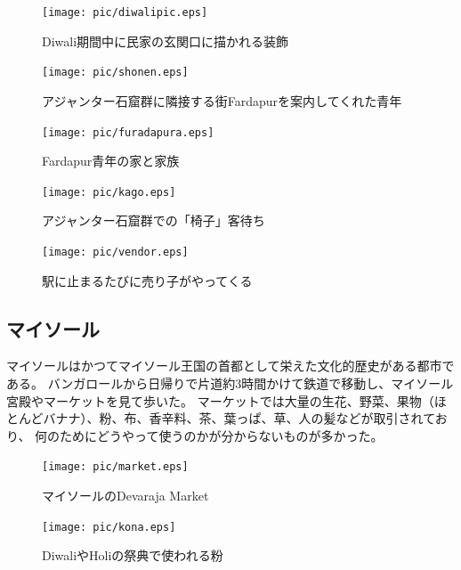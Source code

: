 \begin{figure}[H]
  \begin{minipage}{0.39\hsize}
  \begin{center}
    \texttt{[image: pic/diwalipic.eps]}
  \end{center}
  \caption{Diwali期間中に民家の玄関口に描かれる装飾}
  \end{minipage}
  \begin{minipage}{0.39\hsize}
  \begin{center}
    \texttt{[image: pic/shonen.eps]}
  \end{center}
  \caption{アジャンター石窟群に隣接する街Fardapurを案内してくれた青年}
  \end{minipage}
  \begin{minipage}{0.19\hsize}
  \begin{center}
    \texttt{[image: pic/furadapura.eps]}
  \end{center}
  \caption{Fardapur青年の家と家族}
  \end{minipage}
\end{figure}
\begin{figure}[H]
  \begin{minipage}{0.5\hsize}
  \begin{center}
    \texttt{[image: pic/kago.eps]}
  \end{center}
  \caption{アジャンター石窟群での「椅子」客待ち}
  \end{minipage}
  \begin{minipage}{0.5\hsize}
  \begin{center}
    \texttt{[image: pic/vendor.eps]}
  \end{center}
  \caption{駅に止まるたびに売り子がやってくる}
  \end{minipage}
\end{figure}
\subsection{マイソール}
マイソールはかつてマイソール王国の首都として栄えた文化的歴史がある都市である。
バンガロールから日帰りで片道約3時間かけて鉄道で移動し、マイソール宮殿やマーケットを見て歩いた。
マーケットでは大量の生花、野菜、果物（ほとんどバナナ）、粉、布、香辛料、茶、葉っぱ、草、人の髪などが取引されており、
何のためにどうやって使うのかが分からないものが多かった。
\begin{figure}[H]
  \begin{minipage}{0.5\hsize}
  \begin{center}
    \texttt{[image: pic/market.eps]}
  \end{center}
  \caption{マイソールのDevaraja Market}
  \end{minipage}
  \begin{minipage}{0.5\hsize}
  \begin{center}
    \texttt{[image: pic/kona.eps]}
  \end{center}
  \caption{DiwaliやHoliの祭典で使われる粉}
  \end{minipage}
\end{figure}
